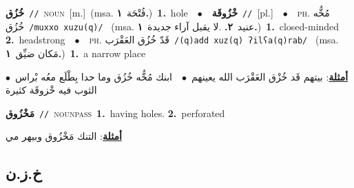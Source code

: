 \documentclass[10pt,a4paper,twoside]{article} %
\begin{document}
\begin{multicols}{2}
{\setlength\topsep{0pt}\textbf{\foreignlanguage{arabic}{خُزُق}}\ {\color{gray}\texttt{//}\color{black}}\ \textsc{noun}\ [m.]\ \color{gray}(msa. \foreignlanguage{arabic}{فُتْحَة}~\foreignlanguage{arabic}{\textbf{١.}})\color{black}\ \textbf{1.}~hole\ \ $\bullet$\ \ \setlength\topsep{0pt}\textbf{\foreignlanguage{arabic}{خْزُوقَة}}\ {\color{gray}\texttt{//}\color{black}}\ [pl.]\ \ $\bullet$\ \ \textsc{ph.} \color{gray} \foreignlanguage{arabic}{مُخُّه خُزُق}\color{black}\ {\color{gray}\texttt{/{\sffamily muxxo xuzu(q)}/}\color{black}}\ \color{gray} (msa. \foreignlanguage{arabic}{عنيد}~\foreignlanguage{arabic}{\textbf{٢.}}  .\foreignlanguage{arabic}{لا يقبل آراء جديدة}~\foreignlanguage{arabic}{\textbf{١.}})\color{black}\ \textbf{1.}~closed-minded  \textbf{2.}~headstrong\ \ $\bullet$\ \ \textsc{ph.} \color{gray} \foreignlanguage{arabic}{قَدّ خُزُق العَقْرَب}\color{black}\ {\color{gray}\texttt{/{\sffamily (q)add xuz(q) ʔilʕa(q)rab}/}\color{black}}\ \color{gray} (msa. \foreignlanguage{arabic}{مَكان ضيِّق}~\foreignlanguage{arabic}{\textbf{١.}})\color{black}\ \textbf{1.}~a narrow place\  \begin{flushright}\color{gray}\foreignlanguage{arabic}{\textbf{\underline{\foreignlanguage{arabic}{أمثلة}}}: بيتهم قَد خُزْق العَقْرَب الله يعينهم\ $\bullet$\ \  ابنك مُخُّه خُزُق وما حدا بِطْلَع معُه بْراس\ $\bullet$\ \  الثوب فيه خْزوقَة كثيرة}\end{flushright}\color{black}} \vspace{2mm}

{\setlength\topsep{0pt}\textbf{\foreignlanguage{arabic}{مَخْزُوق}}\ {\color{gray}\texttt{//}\color{black}}\ \textsc{noun\textunderscore pass}\ \textbf{1.}~having holes.  \textbf{2.}~perforated\  \begin{flushright}\color{gray}\foreignlanguage{arabic}{\textbf{\underline{\foreignlanguage{arabic}{أمثلة}}}: التنك مَخْزُوق وبيهر مي}\end{flushright}\color{black}} \vspace{2mm}

\vspace{-3mm}
\subsection*{\color{blue}\foreignlanguage{arabic}{خ.ز.ن}\color{blue}{}} 


\end{multicols}
\end{document}
